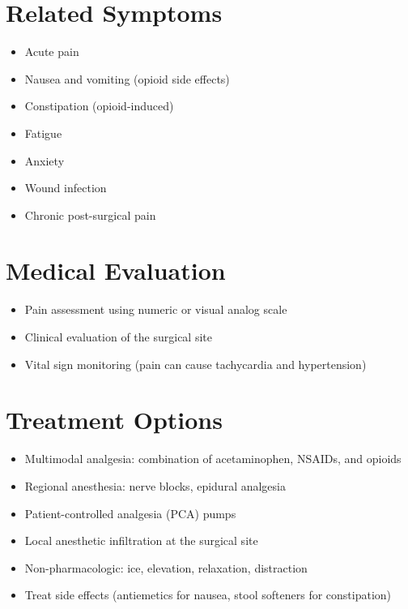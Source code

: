 \section*{Related Symptoms}
\begin{itemize}
\item Acute pain
\item Nausea and vomiting (opioid side effects)
\item Constipation (opioid-induced)
\item Fatigue
\item Anxiety
\item Wound infection
\item Chronic post-surgical pain
\end{itemize}

\section*{Medical Evaluation}
\begin{itemize}
\item Pain assessment using numeric or visual analog scale
\item Clinical evaluation of the surgical site
\item Vital sign monitoring (pain can cause tachycardia and hypertension)
\end{itemize}

\section*{Treatment Options}
\begin{itemize}
\item Multimodal analgesia: combination of acetaminophen, NSAIDs, and opioids
\item Regional anesthesia: nerve blocks, epidural analgesia
\item Patient-controlled analgesia (PCA) pumps
\item Local anesthetic infiltration at the surgical site
\item Non-pharmacologic: ice, elevation, relaxation, distraction
\item Treat side effects (antiemetics for nausea, stool softeners for constipation)
\end{itemize}

